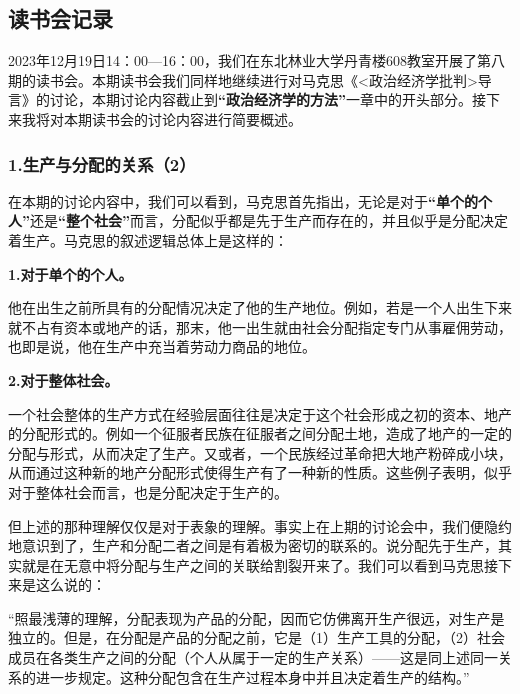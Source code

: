 \documentclass[a4paper,twoside,12pt,AutoFakeBold]{ctexart}
\begin{document}
\subsection{读书会记录}
2023年12月19日14：00—16：00，我们在东北林业大学丹青楼608教室开展了第八期的读书会。本期读书会我们同样地继续进行对马克思《<政治经济学批判>导言》的讨论，本期讨论内容截止到\textbf{“政治经济学的方法”}一章中的开头部分。接下来我将对本期读书会的讨论内容进行简要概述。
\subsubsection{1.生产与分配的关系（2）}
在本期的讨论内容中，我们可以看到，马克思首先指出，无论是对于\textbf{“单个的个人”}还是\textbf{“整个社会”}而言，分配似乎都是先于生产而存在的，并且似乎是分配决定着生产。马克思的叙述逻辑总体上是这样的：

\begin{tcolorbox}
\textbf{1.对于单个的个人。}~\begin{fangsong}
    他在出生之前所具有的分配情况决定了他的生产地位。例如，若是一个人出生下来就不占有资本或地产的话，那末，他一出生就由社会分配指定专门从事雇佣劳动，也即是说，他在生产中充当着劳动力商品的地位。
\end{fangsong}

\textbf{2.对于整体社会。}~\begin{fangsong}
    一个社会整体的生产方式在经验层面往往是决定于这个社会形成之初的资本、地产的分配形式的。例如一个征服者民族在征服者之间分配土地，造成了地产的一定的分配与形式，从而决定了生产。又或者，一个民族经过革命把大地产粉碎成小块，从而通过这种新的地产分配形式使得生产有了一种新的性质。这些例子表明，似乎对于整体社会而言，也是分配决定于生产的。
\end{fangsong}
\end{tcolorbox}

\vspace{0.5cm}
但上述的那种理解仅仅是对于表象的理解。事实上在上期的讨论会中，我们便隐约地意识到了，生产和分配二者之间是有着极为密切的联系的。说分配先于生产，其实就是在无意中将分配与生产之间的关联给割裂开来了。我们可以看到马克思接下来是这么说的：

\vspace{0.3cm}
\begin{adjustwidth}{2em}{2em}
    \qquad\fangsong
    “照最浅薄的理解，分配表现为产品的分配，因而它仿佛离开生产很远，对生产是独立的。但是，在分配是产品的分配之前，它是（1）生产工具的分配，（2）社会成员在各类生产之间的分配（个人从属于一定的生产关系）——这是同上述同一关系的进一步规定。这种分配包含在生产过程本身中并且决定着生产的结构。”
\end{adjustwidth}
\end{document}
